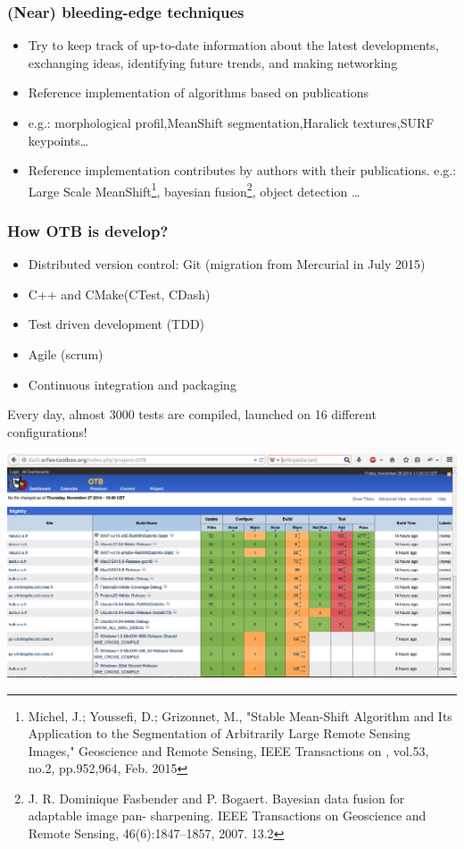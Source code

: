 \documentclass[8pt]{beamer}
\begin{document}
\begin{frame}
\frametitle{(Near) bleeding-edge techniques}
\begin{itemize}
\item Try to keep track of up-to-date information about the latest developments, exchanging ideas, identifying future trends, and making networking
\item Reference implementation of algorithms based on publications
\item e.g.: morphological profil,MeanShift segmentation,Haralick textures,SURF keypoints\ldots
\item Reference implementation contributes by authors with their
  publications. e.g.: Large Scale MeanShift\footnote{Michel, J.; Youssefi, D.; Grizonnet, M., "Stable Mean-Shift Algorithm and Its Application to the Segmentation of Arbitrarily Large Remote Sensing Images," Geoscience and Remote Sensing, IEEE Transactions on , vol.53, no.2, pp.952,964, Feb. 2015}, bayesian fusion\footnote{J. R. Dominique Fasbender and P. Bogaert. Bayesian data fusion for adaptable image pan-
sharpening. IEEE Transactions on Geoscience and Remote Sensing, 46(6):1847–1857, 2007.
13.2}, object detection \ldots
\end{itemize}
\end{frame}

\begin{frame}
\frametitle{How OTB is develop?}
\vspace{-0.5cm}
\begin{itemize}
\item Distributed version control: Git (migration from Mercurial in July 2015)
\item C++ and CMake(CTest, CDash)
\item Test driven development (TDD)
\item Agile (scrum)
\item Continuous integration and packaging
\end{itemize}
Every day, almost 3000 tests are compiled, launched on 16 different configurations!
\begin{center}
\href{http://dash.orfeo-toolbox.org/index.php?project=OTB}{\includegraphics[width=\textwidth,trim=0 250 0 0,clip=true]{images/dashboard.png}}
\end{center}
\end{frame}
\end{document}
